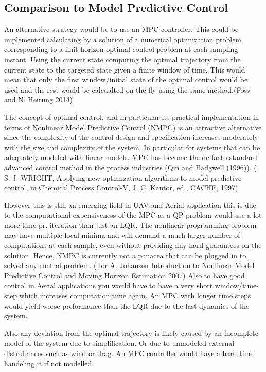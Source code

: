 \subsection{Comparison to Model Predictive Control}\label{sec:prob33}

An alternative strategy would be to use an MPC controller. This could be implemented calculating by a solution of a numerical optimization problem corresponding to a finit-horizon optimal control problem at each sampling instant. Using the current state computing the optimal trajectory from the current state to the targeted state given a finite window of time. This would mean that only the first window/initial state of the optimal control would be used and the rest would be calcualted on the fly using the same method.(Foss and N. Heirung 2014)

The concept of optimal control, and in particular its practical implementation in terms of Nonlinear Model Predictive Control (NMPC) is an attractive alternative since the complexity of the control design and specification increases moderately with the size and complexity of the system. In particular for systems that can be adequately modeled with linear models, MPC has become the de-facto standard advanced control method in the process industries (Qin and Badgwell (1996)).
( S. J. WRIGHT, Applying new optimization algorithms to model predictive control, in Chemical Process Control-V, J. C. Kantor, ed., CACHE, 1997)

However this is still an emerging field in UAV and Aerial application this is due to the computational expensiveness of the MPC as a QP problem would use a lot more time pr. iteration than just an LQR. The nonlinear programming problem may have multiple local minima and will demand a much larger number of computations at each sample, even without providing any hard guarantees on the solution. Hence, NMPC is currently not a panacea that can be plugged in to solved any control problem. (Tor A. Johansen Introduction to Nonlinear Model Predictive Control and Moving Horizon Estimation 2007) Also to have good control in Aerial applications you would have to have a very short window/time-step which increases computation time again. An MPC with longer time steps would yield worse preformance than the LQR due to the fast dynamics of the system.

Also any deviation from the optimal trajectory is likely caused by an incomplete model of the system due to simplification. Or due to unmodeled external distrubances such as wind or drag. An MPC controller would have a hard time handeling it if not modelled.


